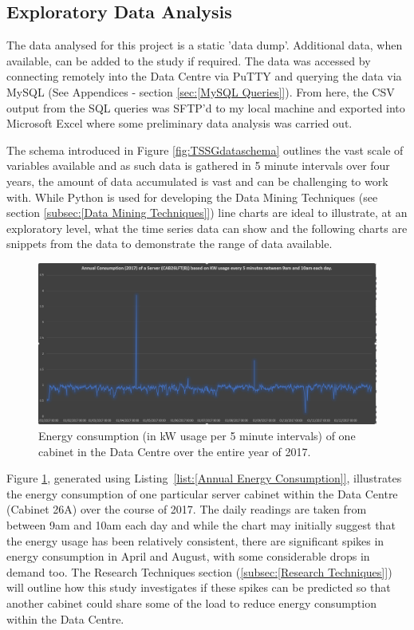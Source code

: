 \documentclass[12pt]{scrartcl}
\begin{document}
\subsection{Exploratory Data Analysis}
\label{subsec:[Exploratory Data Analysis]}
The data analysed for this project is a static 'data dump'. Additional data, when available, can be added to the study if required. The data was accessed by connecting remotely into the Data Centre via PuTTY and querying the data via MySQL (See Appendices - section \ref{sec:[MySQL Queries]}). From here, the CSV output from the SQL queries was SFTP'd to my local machine and exported into Microsoft Excel where some preliminary data analysis was carried out. 

The schema introduced in Figure \ref{fig:TSSGdataschema} outlines the vast scale of variables available and as such data is gathered in 5 minute intervals over four years, the amount of data accumulated is vast and can be challenging to work with. While Python is used for developing the Data Mining Techniques (see section \ref{subsec:[Data Mining Techniques]})  line charts are ideal to illustrate, at an exploratory level, what the time series data can show and the following charts are snippets from the data to demonstrate the range of data available.

\begin{figure}[h]
  \caption{Energy consumption (in kW usage per 5 minute intervals) of one cabinet in the Data Centre over the entire year of 2017.}
  \label{fig:Annualenergyfigure}
  \centering
    \includegraphics[scale=0.30]{Annual_energy_consumption}
\end{figure}

Figure \ref{fig:Annualenergyfigure}, generated using Listing~\ref{list:[Annual Energy Consumption]}, illustrates the energy consumption of one particular server cabinet within the Data Centre (Cabinet 26A) over the course of 2017. The daily readings are taken from between 9am and 10am each day and while the chart may initially suggest that the energy usage has been relatively consistent, there are significant spikes in energy consumption in April and August, with some considerable drops in demand too. The Research Techniques section (\ref{subsec:[Research Techniques]}) will outline how this study investigates if these spikes can be predicted so that another cabinet could share some of the load to reduce energy consumption within the Data Centre.
\end{document}

